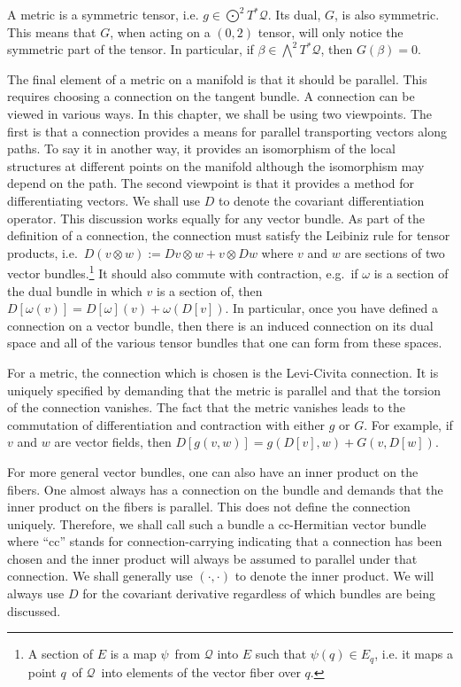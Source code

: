 \documentclass[11pt]{article}
\theoremstyle{remark}
\begin{document}
A metric is a symmetric tensor, i.e. $g \in \ensuremath{\bigodot^{2}{\ensuremath{T^{*} \ensuremath{\mathcal{Q}}}}}$. Its dual,
$G$, is also symmetric. This means that $G$, when acting on a $(0,2)$
tensor, will only notice the symmetric part of the tensor. In
particular, if $\beta \in \ensuremath{\bigwedge^{2}{\ensuremath{T^{*} \ensuremath{\mathcal{Q}}}}}$, then $G(\beta) = 0$. 

The final element of a metric on a manifold is that it should be
parallel. This requires choosing a connection on the tangent
bundle. A connection can be viewed in various ways. In this chapter,
we shall be using two viewpoints. The first is that a connection 
 provides a means for parallel
transporting vectors along paths. To say it in another way, it
provides an isomorphism of the local structures at different points on
the manifold although the isomorphism may depend on the path. The
second viewpoint is that it provides a method for differentiating
vectors. We shall use $D$ to denote the covariant differentiation
operator.  This discussion works equally for any vector bundle. 
 As part of the definition of a connection, the connection must
 satisfy the Leibiniz rule for tensor products, i.e.\ $D(v \otimes w)
 \ensuremath{:=} Dv \otimes w + v \otimes Dw$ where $v$ and $w$ are sections of
 two vector bundles.\footnote{A 
section of $E$
is a map \ensuremath{\psi}\ from $\ensuremath{\mathcal{Q}}$ into $E$ such that $\ensuremath{\psi}(\ensuremath{q}) \in
E_{\ensuremath{q}}$, i.e. it maps a point \ensuremath{q}\  of \ensuremath{\mathcal{Q}}\ into elements of the
vector fiber over \ensuremath{q}.} It should also commute with contraction, e.g.\ 
if $\omega$ is a section of the dual bundle in which $v$
 is a section of, then $D[\omega(v)] = D[\omega] (v) + \omega(D[v])$. 
In particular, once you have defined a connection on a vector bundle,
then there is an induced connection on its dual space and all of the
various tensor bundles that one can form from these spaces. 


For a metric, 
the connection which is chosen is the Levi-Civita
connection. It is uniquely specified by demanding that the metric is
parallel and that the torsion of the connection vanishes. The fact
that the metric vanishes leads to the commutation of differentiation
and contraction with
either $g$ or $G$. 
For example, if $v$ and $w$ are vector fields, then $D[g(v,w)] =
g(D[v],w) +G(v,D[w])$.

 
For more
general vector bundles, one can also have an inner product on the
fibers. One almost always has a connection on the bundle and demands
that the inner product on the fibers is parallel. This does not define
the connection uniquely. Therefore, we shall call such a bundle a
cc-Hermitian vector bundle where ``cc'' stands for connection-carrying
indicating that a connection has been chosen and the inner product
will always be assumed to parallel under that connection. We shall
generally use $\ensuremath{({\cdot}, {\cdot})}$ to denote the inner product. We
will always use $D$ for the covariant derivative regardless of which
bundles are being discussed. 
\end{document}
